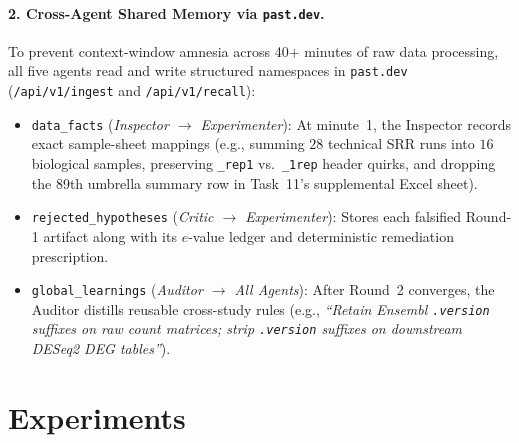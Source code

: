 \documentclass[10pt,twocolumn]{article}
\begin{document}
\paragraph{2. Cross-Agent Shared Memory via \texttt{past.dev}.}
To prevent context-window amnesia across 40+ minutes of raw data processing, all five agents read and write structured namespaces in \texttt{past.dev} (\texttt{/api/v1/ingest} and \texttt{/api/v1/recall}):
\begin{itemize}[leftmargin=14pt,itemsep=2pt]
    \item \texttt{data\_facts} (\emph{Inspector $\rightarrow$ Experimenter}): At minute~1, the Inspector records exact sample-sheet mappings (e.g., summing $28$ technical SRR runs into $16$ biological samples, preserving \texttt{\_rep1} vs.\ \texttt{\_1rep} header quirks, and dropping the 89th umbrella summary row in Task~11's supplemental Excel sheet).
    \item \texttt{rejected\_hypotheses} (\emph{Critic $\rightarrow$ Experimenter}): Stores each falsified Round-1 artifact along with its $e$-value ledger and deterministic remediation prescription.
    \item \texttt{global\_learnings} (\emph{Auditor $\rightarrow$ All Agents}): After Round~2 converges, the Auditor distills reusable cross-study rules (e.g., \emph{``Retain Ensembl \texttt{.version} suffixes on raw count matrices; strip \texttt{.version} suffixes on downstream DESeq2 DEG tables''}).
\end{itemize}

\section{Experiments}
\label{sec:experiments}
\end{document}
